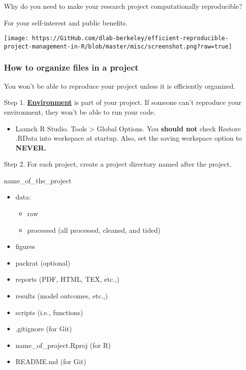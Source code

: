 \documentclass[
]{book}
\providecommand{\tightlist}{%
  \setlength{\itemsep}{0pt}\setlength{\parskip}{0pt}}
\begin{document}
Why do you need to make your research project computationally reproducible?

For your self-interest and public benefits.

\texttt{[image: https://GitHub.com/dlab-berkeley/efficient-reproducible-project-management-in-R/blob/master/misc/screenshot.png?raw=true]}

\hypertarget{how-to-organize-files-in-a-project}{%
\subsubsection{How to organize files in a project}\label{how-to-organize-files-in-a-project}}

You won't be able to reproduce your project unless it is efficiently organized.

Step 1. \href{https://environments.rstudio.com/}{\textbf{Environment}} is part of your project. If someone can't reproduce your environment, they won't be able to run your code.

\begin{itemize}
\tightlist
\item
  Launch R Studio. Tools \textgreater{} Global Options. You \textbf{should not} check Restore .RData into workspace at startup. Also, set the saving workspace option to \textbf{NEVER.}
\end{itemize}

Step 2. For each project, create a project directory named after the project.

name\_of\_the\_project

\begin{itemize}
\tightlist
\item
  data:

  \begin{itemize}
  \tightlist
  \item
    raw
  \item
    processed (all processed, cleaned, and tided)
  \end{itemize}
\item
  figures
\item
  packrat (optional)
\item
  reports (PDF, HTML, TEX, etc.,)
\item
  results (model outcomes, etc.,)
\item
  scripts (i.e., functions)
\item
  .gitignore (for Git)
\item
  name\_of\_project.Rproj (for R)
\item
  README.md (for Git)
\end{itemize}
\end{document}
